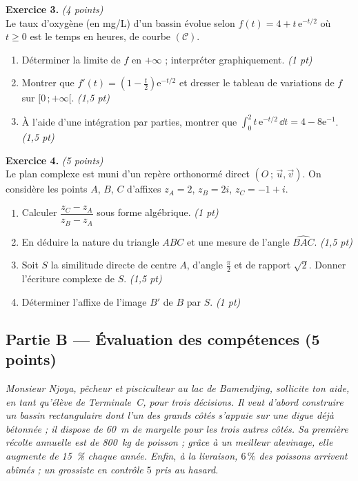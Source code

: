 \smallskip
\noindent\textbf{Exercice 3.} \hfill\textit{(4 points)}\\
Le taux d'oxygène (en mg/L) d'un bassin évolue selon $f(t)=4+t\,\mathrm{e}^{-t/2}$ où $t\ge0$
est le temps en heures, de courbe $(\mathcal{C})$.
\begin{enumerate}[label=\arabic*)]
\item Déterminer la limite de $f$ en $+\infty$ ; interpréter graphiquement. \hfill\textit{(1 pt)}
\item Montrer que $f'(t)=\left(1-\tfrac{t}{2}\right)\mathrm{e}^{-t/2}$ et dresser le tableau de variations de $f$ sur $[0\,;+\infty[$. \hfill\textit{(1,5 pt)}
\item À l'aide d'une intégration par parties, montrer que $\displaystyle\int_0^{2}t\,\mathrm{e}^{-t/2}\,\dd t=4-8\mathrm{e}^{-1}$. \hfill\textit{(1,5 pt)}
\end{enumerate}

\smallskip
\noindent\textbf{Exercice 4.} \hfill\textit{(5 points)}\\
Le plan complexe est muni d'un repère orthonormé direct $(O\,;\,\vec u,\vec v)$. On considère
les points $A$, $B$, $C$ d'affixes $z_A=2$, $z_B=2i$, $z_C=-1+i$.
\begin{enumerate}[label=\arabic*)]
\item Calculer $\dfrac{z_C-z_A}{z_B-z_A}$ sous forme algébrique. \hfill\textit{(1 pt)}
\item En déduire la nature du triangle $ABC$ et une mesure de l'angle $\widehat{BAC}$. \hfill\textit{(1,5 pt)}
\item Soit $S$ la similitude directe de centre $A$, d'angle $\frac\pi2$ et de rapport $\sqrt2$.
Donner l'écriture complexe de $S$. \hfill\textit{(1,5 pt)}
\item Déterminer l'affixe de l'image $B'$ de $B$ par $S$. \hfill\textit{(1 pt)}
\end{enumerate}

\subsection*{Partie B — Évaluation des compétences \hfill (5 points)}

\noindent\textit{Monsieur Njoya, pêcheur et pisciculteur au lac de Bamendjing, sollicite ton
aide, en tant qu'élève de Terminale~C, pour trois décisions. Il veut d'abord construire un
bassin rectangulaire dont l'un des grands côtés s'appuie sur une digue déjà bétonnée ; il
dispose de \SI{60}{\metre} de margelle pour les trois autres côtés. Sa première récolte
annuelle est de \SI{800}{\kilogram} de poisson ; grâce à un meilleur alevinage, elle augmente
de \SI{15}{\percent} chaque année. Enfin, à la livraison, $6\,\%$ des poissons arrivent
abîmés ; un grossiste en contrôle $5$ pris au hasard.}


